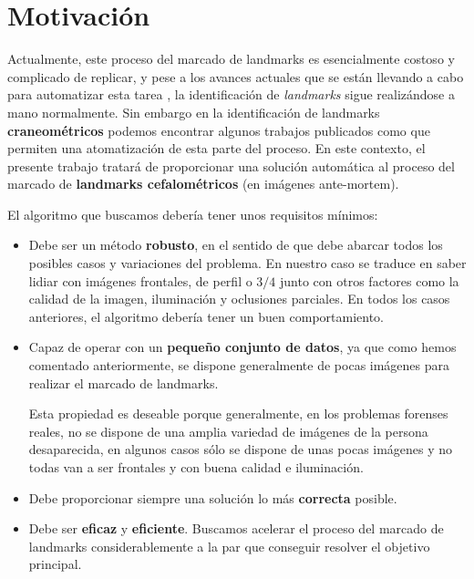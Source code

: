 \medskip 


\section{Motivación}

Actualmente, este proceso del marcado de landmarks es esencialmente costoso y complicado de replicar, y pese a los avances actuales que se están llevando a cabo para automatizar esta tarea \cite{Huete2015PastPA}, la identificación de \textit{landmarks} sigue realizándose a mano normalmente. Sin embargo en la identificación de landmarks \textbf{craneométricos} podemos encontrar algunos trabajos publicados como \cite{bermejo2021automatic} que permiten una atomatización de esta parte del proceso. En este contexto, el presente trabajo tratará de proporcionar una solución automática al proceso del marcado de \textbf{landmarks cefalométricos} (en imágenes ante-mortem).

\medskip

\noindent El algoritmo que buscamos debería tener unos requisitos mínimos: 

\begin{itemize}
    \item Debe ser un método \textbf{robusto}, en el sentido de que debe abarcar todos los posibles casos y variaciones del problema. En nuestro caso se traduce en saber lidiar con imágenes frontales, de perfil o $3/4$ junto con otros factores como la calidad de la imagen, iluminación y oclusiones parciales. En todos los casos anteriores, el algoritmo debería tener un buen comportamiento.
    \item Capaz de operar con un \textbf{pequeño conjunto de datos}, ya que como hemos comentado anteriormente, se dispone generalmente de pocas imágenes para realizar el marcado de landmarks.
    
    \medskip

    \noindent Esta propiedad es deseable porque generalmente, en los problemas forenses reales, no se dispone de una amplia variedad de imágenes de la persona desaparecida, en algunos casos sólo se dispone de unas pocas imágenes y no todas van a ser frontales y con buena calidad e iluminación.

    \item Debe proporcionar siempre una solución lo más \textbf{correcta} posible.  
    
    \item Debe ser \textbf{eficaz} y \textbf{eficiente}. Buscamos acelerar el proceso del marcado de landmarks considerablemente a la par que conseguir resolver el objetivo principal.
\end{itemize}

